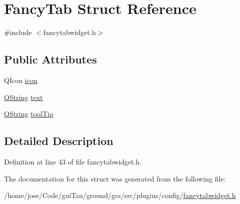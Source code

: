 \hypertarget{struct_fancy_tab}{\section{Fancy\-Tab Struct Reference}
\label{struct_fancy_tab}
}


{\ttfamily \#include $<$fancytabwidget.\-h$>$}

\subsection*{Public Attributes}
\begin{DoxyCompactItemize}
\item 
Q\-Icon \hyperlink{group___core_plugin_gae60277b0cf871bcdf36b505bc485e1d5}{icon}
\item 
\hyperlink{group___u_a_v_objects_plugin_gab9d252f49c333c94a72f97ce3105a32d}{Q\-String} \hyperlink{group___core_plugin_ga9e58434e197c41cc12428b0767b4e32f}{text}
\item 
\hyperlink{group___u_a_v_objects_plugin_gab9d252f49c333c94a72f97ce3105a32d}{Q\-String} \hyperlink{group___core_plugin_ga8512ccbf00fd40d53ba9d4e7f47c9f0b}{tool\-Tip}
\end{DoxyCompactItemize}


\subsection{Detailed Description}


Definition at line 43 of file fancytabwidget.\-h.



The documentation for this struct was generated from the following file\-:\begin{DoxyCompactItemize}
\item 
/home/jose/\-Code/gui\-Tau/ground/gcs/src/plugins/config/\hyperlink{config_2fancytabwidget_8h}{fancytabwidget.\-h}\end{DoxyCompactItemize}
